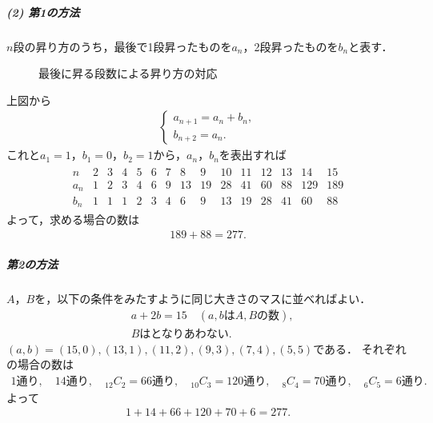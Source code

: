 \documentclass[../main.tex]{subfiles}
\begin{document}
\subparagraph{(2) 第1の方法}
$n$段の昇り方のうち，最後で1段昇ったものを$a_n$，2段昇ったものを$b_n$と表す．
\begin{figure}[H]
  \begin{center}
  \end{center}
  \caption{最後に昇る段数による昇り方の対応}
\end{figure}
上図から
\begin{align}
  \begin{cases}a_{n+1}=a_n+b_n,\\b_{n+2}=a_n.
  \end{cases}
\end{align}
これと$a_1=1$，$b_1=0$，$b_2=1$から，$a_n$，$b_n$を表出すれば
\begin{align}
  \begin{array}{c|rrrrrrrrrrrrrr}
    n&2&3&4&5&6&7&8&9&10&11&12&13&14&15\\\hline
    a_n&1&2&3&4&6&9&13&19&28&41&60&88&129&189\\
    b_n&1&1&1&2&3&4&6&9&13&19&28&41&60&88
  \end{array}
\end{align}
よって，求める場合の数は
\begin{align}189+88=277.
\end{align}

\subparagraph{第2の方法}
$A$，$B$を，以下の条件をみたすように同じ大きさのマスに並べればよい．
\begin{align}
  &a+2b=15\quad(a,b\text{は}A,B\text{の数}),\\
  &B\text{はとなりあわない}.
\end{align}
$(a,b)=(15,0),(13,1),(11,2),(9,3),(7,4),(5,5)$である．
それぞれの場合の数は
\begin{align}
  1\text{通り},\quad14\text{通り},\quad
  {}_{12}C_2=66\text{通り},\quad{}_{10}C_3=120\text{通り},\quad
  {}_8C_4=70\text{通り},\quad{}_6C_5=6\text{通り}.
\end{align}
よって
\begin{align}1+14+66+120+70+6=277.
\end{align}
\newpage
\end{document}
